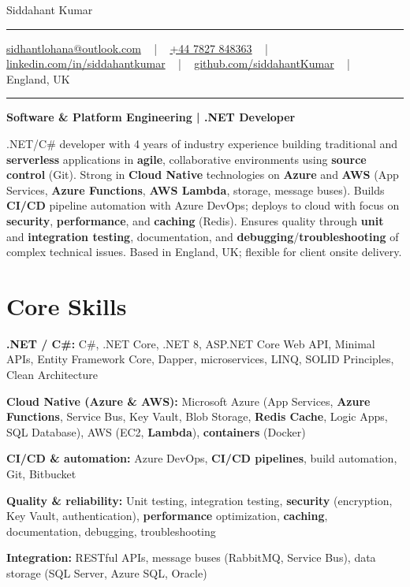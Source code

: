\documentclass[letterpaper,10pt]{article}
\newcommand{\documentTitle}[2]{
  \begin{center}
    \vspace*{-0.3in}
    {\Huge\color{accentTitle} #1}
    \vspace{8pt}
    {\color{accentLine} \hrule}
    \vspace{2pt}
    \footnotesize{#2}
    \vspace{2pt}
    {\color{accentLine} \hrule}
  \end{center}
}
\newenvironment{resume_list}{
  \vspace{-7pt}
  \begin{itemize}[itemsep=-2px, parsep=1pt, leftmargin=30pt]
}{
  \end{itemize}
}
\begin{document}
\documentTitle{Siddahant Kumar}{
\vspace{0.1cm}
\href{mailto:sidhantlohana@outlook.com}{sidhantlohana@outlook.com} ~ | ~
\href{tel:+447827848363}{+44 7827 848363} ~ | ~
\href{https://www.linkedin.com/in/siddahantkumar/}{linkedin.com/in/siddahantkumar} ~ | ~
\href{https://github.com/siddahantKumar}{github.com/siddahantKumar} ~ | ~
England, UK
}

\begin{center}
\textbf{Software \& Platform Engineering | .NET Developer}
\end{center}

.NET/C\# developer with 4 years of industry experience building traditional and \textbf{serverless} applications in \textbf{agile}, collaborative environments using \textbf{source control} (Git). Strong in \textbf{Cloud Native} technologies on \textbf{Azure} and \textbf{AWS} (App Services, \textbf{Azure Functions}, \textbf{AWS Lambda}, storage, message buses). Builds \textbf{CI/CD} pipeline automation with Azure DevOps; deploys to cloud with focus on \textbf{security}, \textbf{performance}, and \textbf{caching} (Redis). Ensures quality through \textbf{unit} and \textbf{integration testing}, documentation, and \textbf{debugging}/\textbf{troubleshooting} of complex technical issues. Based in England, UK; flexible for client onsite delivery.


\section{Core Skills}

\begin{resume_list}
    \item \textbf{.NET / C\#:} C\#, .NET Core, .NET 8, ASP.NET Core Web API, Minimal APIs, Entity Framework Core, Dapper, microservices, LINQ, SOLID Principles, Clean Architecture
    \item \textbf{Cloud Native (Azure \& AWS):} Microsoft Azure (App Services, \textbf{Azure Functions}, Service Bus, Key Vault, Blob Storage, \textbf{Redis Cache}, Logic Apps, SQL Database), AWS (EC2, \textbf{Lambda}), \textbf{containers} (Docker)
    \item \textbf{CI/CD \& automation:} Azure DevOps, \textbf{CI/CD pipelines}, build automation, Git, Bitbucket
    \item \textbf{Quality \& reliability:} Unit testing, integration testing, \textbf{security} (encryption, Key Vault, authentication), \textbf{performance} optimization, \textbf{caching}, documentation, debugging, troubleshooting
    \item \textbf{Integration:} RESTful APIs, message buses (RabbitMQ, Service Bus), data storage (SQL Server, Azure SQL, Oracle)
\end{resume_list}
\end{document}
